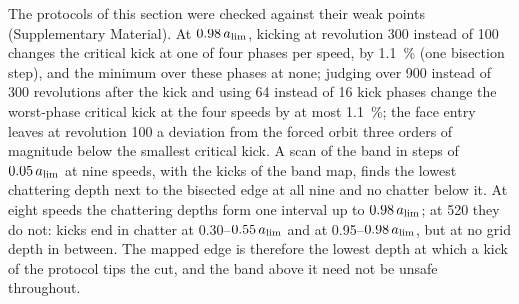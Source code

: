 The protocols of this section were checked against their weak points (Supplementary Material). At $0.98\,a_{\lim}$, kicking at revolution 300 instead of 100 changes the critical kick at one of four phases per speed, by \SI{1.1}{\percent} (one bisection step), and the minimum over these phases at none; judging over 900 instead of 300 revolutions after the kick and using 64 instead of 16 kick phases change the worst-phase critical kick at the four speeds by at most \SI{1.1}{\percent}; the face entry leaves at revolution 100 a deviation from the forced orbit three orders of magnitude below the smallest critical kick. A scan of the band in steps of $0.05\,a_{\lim}$ at nine speeds, with the kicks of the band map, finds the lowest chattering depth next to the bisected edge at all nine and no chatter below it. At eight speeds the chattering depths form one interval up to $0.98\,a_{\lim}$; at \SI{520}{\rpm} they do not: kicks end in chatter at 0.30--$0.55\,a_{\lim}$ and at 0.95--$0.98\,a_{\lim}$, but at no grid depth in between. The mapped edge is therefore the lowest depth at which a kick of the protocol tips the cut, and the band above it need not be unsafe throughout.
